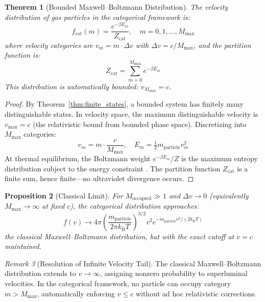 \documentclass[twocolumn,10pt,a4paper]{article}
\theoremstyle{plain}
\newtheorem{theorem}{Theorem}[section]
\newtheorem{proposition}[theorem]{Proposition}
\theoremstyle{definition}
\theoremstyle{remark}
\newtheorem{remark}[theorem]{Remark}
\newcommand{\kB}{k_{\mathrm{B}}}
\begin{document}
\begin{theorem}[Bounded Maxwell--Boltzmann Distribution]
\label{thm:maxwell}
The velocity distribution of gas particles in the categorical framework is:
\begin{equation}
    f_{\mathrm{cat}}(m) = \frac{e^{-\beta E_m}}{Z_{\mathrm{cat}}}, \quad m = 0, 1, \ldots, M_{\max}
\end{equation}
where velocity categories are $v_m = m \cdot \Delta v$ with $\Delta v = c/M_{\max}$, and the partition function is:
\begin{equation}
    Z_{\mathrm{cat}} = \sum_{m=0}^{M_{\max}} e^{-\beta E_m}
\end{equation}
This distribution is automatically bounded: $v_{M_{\max}} = c$.
\end{theorem}

\begin{proof}
By Theorem~\ref{thm:finite_states}, a bounded system has finitely many distinguishable states. In velocity space, the maximum distinguishable velocity is $v_{\max} = c$ (the relativistic bound from bounded phase space). Discretizing into $M_{\max}$ categories:
\begin{equation}
    v_m = m \cdot \frac{c}{M_{\max}}, \quad E_m = \tfrac{1}{2}m_{\mathrm{particle}} v_m^2
\end{equation}
At thermal equilibrium, the Boltzmann weight $e^{-\beta E_m}/Z$ is the maximum entropy distribution subject to the energy constraint \cite{jaynes1957}. The partition function $Z_{\mathrm{cat}}$ is a finite sum, hence finite---no ultraviolet divergence occurs.
\end{proof}

\begin{proposition}[Classical Limit]
For $M_{\mathrm{occupied}} \gg 1$ and $\Delta v \to 0$ (equivalently $M_{\max} \to \infty$ at fixed $c$), the categorical distribution approaches:
\begin{equation}
    f(v) \to 4\pi \left(\frac{m_{\mathrm{particle}}}{2\pi \kB T}\right)^{3/2} v^2 e^{-m_{\mathrm{particle}} v^2/(2\kB T)}
\end{equation}
the classical Maxwell--Boltzmann distribution, but with the exact cutoff at $v = c$ maintained.
\end{proposition}

\begin{remark}[Resolution of Infinite Velocity Tail]
The classical Maxwell--Boltzmann distribution extends to $v \to \infty$, assigning nonzero probability to superluminal velocities. In the categorical framework, no particle can occupy category $m > M_{\max}$, automatically enforcing $v \leq c$ without ad hoc relativistic corrections.
\end{remark}
\end{document}
